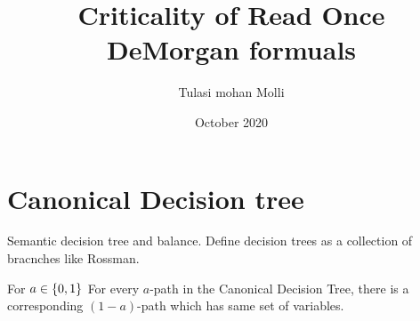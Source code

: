 \documentclass{article}
\title{Criticality of Read Once DeMorgan formuals}
\author{Tulasi mohan Molli}
\date{October 2020}
\begin{document}
\maketitle

\section{Canonical Decision tree}
    
    \begin{definition}[CDT]
        Semantic decision tree and balance. Define decision trees as a collection of bracnches like Rossman.    
    \end{definition}

    \begin{observation}
        For $a \in \{0,1\}^{}$ For every $a$-path in the Canonical Decision Tree, there is a corresponding $(1-a)$-path which has same set of variables. 
    \end{observation}
\end{document}
